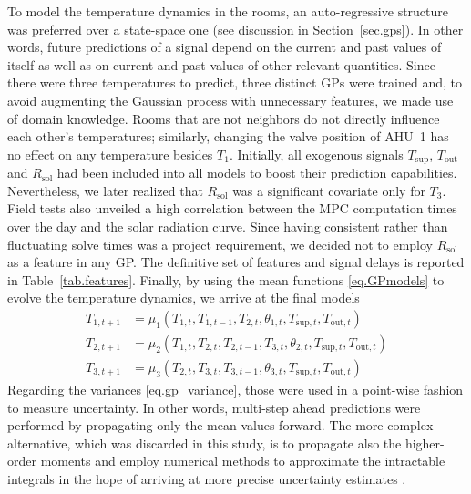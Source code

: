 To model the temperature dynamics in the rooms, an auto-regressive structure was preferred over a state-space one (see discussion in Section~\ref{sec.gps}). In other words, future predictions of a signal depend on the current and past values of itself as well as on current and past values of other relevant quantities. Since there were three temperatures to predict, three distinct GPs were trained and, to avoid augmenting the Gaussian process with unnecessary features, we made use of domain knowledge. Rooms that are not neighbors do not directly influence each other's temperatures; similarly, changing the valve position of AHU~1 has no effect on any temperature besides $T_1$. Initially, all exogenous signals $T_\text{sup}$, $T_\text{out}$ and $R_\text{sol}$ had been included into all models to boost their prediction capabilities. Nevertheless, we later realized that $R_\text{sol}$ was a significant covariate only for $T_3$. Field tests also unveiled a high correlation between the MPC computation times over the day and the solar radiation curve. Since having consistent rather than fluctuating solve times was a project requirement, we decided not to employ $R_\text{sol}$ as a feature in any GP. The definitive set of features and signal delays is reported in Table~\ref{tab.features}. Finally, by using the mean functions \eqref{eq.GPmodels} to evolve the temperature dynamics, we arrive at the final models
\begin{subequations}
	\begin{align}
		T_{1,t+1} &= \mu_{1}(T_{1,t}, T_{1,t-1}, T_{2,t}, \theta_{1,t},T_{\text{sup},t},T_{\text{out},t}) \\
		T_{2,t+1} &= \mu_{2}(T_{1,t}, T_{2,t}, T_{2,t-1}, T_{3,t}, \theta_{2,t},T_{\text{sup},t},T_{\text{out},t}) \\
		T_{3,t+1} &= \mu_{3}(T_{2,t}, T_{3,t}, T_{3,t-1}, \theta_{3,t},T_{\text{sup},t},T_{\text{out},t}) 
	\end{align}
	\label{eq.GPmodels}
\end{subequations}
Regarding the variances \eqref{eq.gp_variance}, those were used in a point-wise fashion to measure uncertainty. In other words, multi-step ahead predictions were performed by propagating only the mean values forward. The more complex alternative, which was discarded in this study, is to propagate also the higher-order moments and employ numerical methods to approximate the intractable integrals in the hope of arriving at more precise uncertainty estimates \citep{girard2004approximate,mchutchon2011gaussian}.

